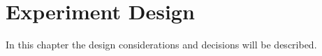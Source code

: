 
\chapter{Experiment Design}
\label{chapter:ExperimentDesign}
In this chapter the design considerations and decisions will be described.






